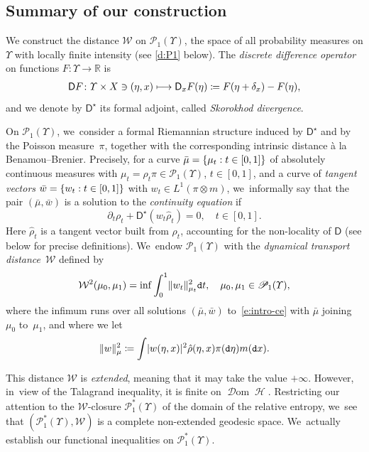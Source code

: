 \documentclass[JEP,XML,SOM,Unicode,published]{cedram}
\newcommand\mto{\mathchoice{\longmapsto}{\mapsto}{\mapsto}{\mapsto}}
\theoremstyle{definition}
\theoremstyle{remark}
\DeclarePairedDelimiter{\set}{\lbrace}{\rbrace}
\DeclarePairedDelimiter{\abs}{\lvert}{\rvert}
\DeclarePairedDelimiter{\norm}{\lVert}{\rVert}
\DeclareMathOperator{\ent}{\mathcal{H}}
\DeclareMathOperator{\dom}{\mathscr{D}om}
\begin{document}
\subsection{Summary of our construction}
We construct the distance $\mathcal{W}$ on $\mathscr{P}_{1}(\varUpsilon)$, the space of all probability measures on $\varUpsilon$ with locally finite intensity (see \cref{d:P1} below).
The \emph{discrete difference operator} on functions $F\colon\varUpsilon\to\mathbb{R}$ is
\begin{align*}
\mathsf{D} F\colon \varUpsilon\times X\ni (\eta,x) \mto \mathsf{D}_x F(\eta) \coloneq F(\eta+\delta_x)-F(\eta),
\end{align*}
and we denote by $\mathsf{D}^{\star}$ its formal adjoint, called \emph{Skorokhod divergence}.

On $\mathscr{P}_{1}(\varUpsilon)$, we~consider a formal Riemannian structure induced by $\mathsf{D}^{\star}$ and by the Poisson measure~$\pi$, together with the corresponding intrinsic distance à la Benamou--Brenier.
Precisely, for a curve $\bar\mu= \set{ \mu_{t} : t \in [0,1]}$ of absolutely continuous measures with $\mu_t=\rho_t\pi\in\mathscr{P}_{1}(\varUpsilon)$, $t \in [0,1]$, and a curve of \emph{tangent vectors} $\bar{w}= \set{ w_{t} : t \in [0,1] }$ with $w_t\in L^1(\pi\otimes m)$, we~informally say that the pair $(\bar{\mu},\bar{w})$ is a solution to the \emph{continuity equation} if
\begin{equation}\label{e:intro-ce}
\partial_{t} \rho_{t} + \mathsf{D}^{\star}(w_{t} \hat{\rho}_{t}) = 0, \quad t\in [0,1].
\end{equation}
Here $\hat{\rho}_t$ is a tangent vector built from $\rho_t$, accounting for the non-locality of $\mathsf{D}$ (see below for precise definitions). We~endow $\mathscr{P}_{1}(\varUpsilon)$ with the \emph{dynamical transport distance}~$\mathcal{W}$ defined by
\begin{equation*}
\mathcal{W}^{2}(\mu_{0}, \mu_{1}) = \inf \int_0^1 \norm{w_t}_{\mu_{t}}^2 \mathtt{d} t, \quad \mu_0,\mu_1\in\mathscr{P}_1(\varUpsilon),
\end{equation*}
where the infimum runs over all solutions $(\bar{\mu},\bar{w})$ to~\cref{e:intro-ce} with $\bar{\mu}$ joining $\mu_{0}$ to~$\mu_{1}$, and where we let
\begin{equation*}
\norm{w}_{\mu}^{2} \coloneq \int \abs{w(\eta, x)}^{2} \hat{\rho}(\eta, x) \pi(\mathtt{d} \eta) m(\mathtt{d} x) .
\end{equation*}

This distance $\mathcal{W}$ is \emph{extended}, meaning that it may take the value $+\infty$.
However, in~view of the Talagrand inequality, it is finite on $\dom \ent$.
Restricting our attention to the $\mathcal W$-closure $\mathscr{P}_{1}^{*}(\varUpsilon)$ of the domain of the relative entropy, we~see that $(\mathscr{P}_{1}^{*}(\varUpsilon), \mathcal{W})$ is a complete non-extended geodesic space. We~actually establish our functional inequalities on $\mathscr{P}_{1}^{*}(\varUpsilon)$.
\end{document}
